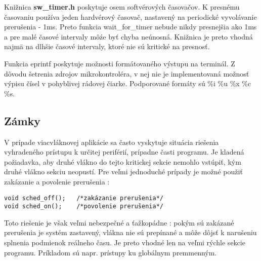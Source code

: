 Knižnica \textbf{sw\_timer.h} poskytuje osem softvérových časovačov. K presnému časovaniu používa jeden hardvérový časovač, nastavený na periodické vyvolávanie prerušenia - 1ms. Preto funkcia  wait\_for\_timer nebude nikdy presnejšia ako 1ms a pre malé časové intervaly môźe byť chyba neúnosná. Knižnica je preto vhodná najmä na dlhšie časové intervaly, ktoré nie sú kritické na presnosť.

Funkcia eprintf poskytuje možnosti formátovaného výstupu na terminál. Z dôvodu šetrenia zdrojov mikrokontroléra, v nej nie je implementovaná možnosť výpisu čísel v pohyblivej rádovej čiarke. Podporované formáty sú \%i \%u \%x \%c \%s.


\subsection{Zámky}

V prípade viacvláknovej aplikácie sa často vyskytuje situácia riešenia vyhradeného prístupu k určitej periférií, prípadne časti programu. Je kladená požiadavka, aby druhé vlákno do tejto kritickej sekcie nemohlo vstúpiť, kým druhé vlákno sekciu neopustí. Pre veľmi jednoduché prípady je možné použiť zakázanie a povolenie prerušenia :
{\small
\begin{verbatim}
void sched_off();	/*zakázanie prerušenia*/
void sched_on();	/*povolenie prerušenia*/
\end{verbatim}
}
Toto riešenie je však veľmi nebezpečné a ťažkopádne : pokým sú zakázané prerušenia je systém zastavený, vlákna nie sú prepínané a môže dôjsť k narušeniu splnenia podmienok reálneho času. Je preto vhodné len na veľmi rýchle sekcie programu. Príkladom sú napr. prístupy ku globálnym premmenným.

